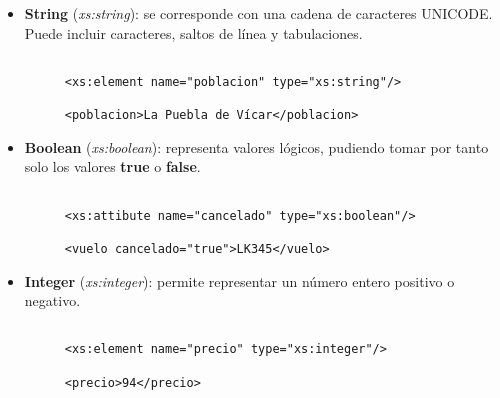 \begin{itemize}
    \item \textbf{String} (\textit{xs:string}): se corresponde con una cadena de caracteres UNICODE. Puede incluir caracteres, saltos de línea y tabulaciones.

    \begin{figure}[h]
        \begin{tcolorbox}[sharp corners, colback=yellow!30, colframe=white!20]
            \scriptsize
            \begin{verbatim}

<xs:element name="poblacion" type="xs:string"/>

<poblacion>La Puebla de Vícar</poblacion>
            \end{verbatim}
        \end{tcolorbox}
    \end{figure}

    \item \textbf{Boolean} (\textit{xs:boolean}): representa valores lógicos, pudiendo tomar por tanto solo los valores \textbf{true} o \textbf{false}.

    \begin{figure}[H]
        \begin{tcolorbox}[sharp corners, colback=yellow!30, colframe=white!20]
            \scriptsize
            \begin{verbatim}

<xs:attibute name="cancelado" type="xs:boolean"/>

<vuelo cancelado="true">LK345</vuelo>
            \end{verbatim}
        \end{tcolorbox}
    \end{figure}

    \item \textbf{Integer} (\textit{xs:integer}): permite representar un número entero positivo o negativo.

     \begin{figure}[H]
        \begin{tcolorbox}[sharp corners, colback=yellow!30, colframe=white!20]
            \scriptsize
            \begin{verbatim}

<xs:element name="precio" type="xs:integer"/>

<precio>94</precio>
            \end{verbatim}
        \end{tcolorbox}
    \end{figure}


\end{itemize}
